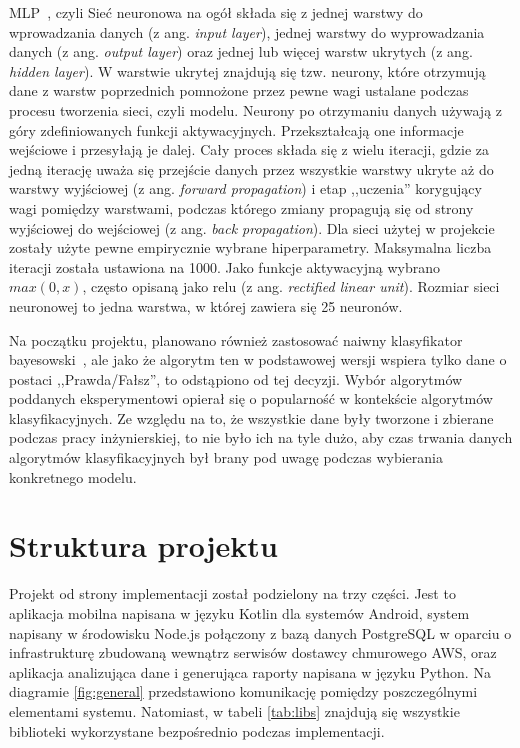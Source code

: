 \documentclass[a4paper,twoside,12pt]{book}
\newcommand{\obcy}[1]{\emph{#1}}
\newcommand{\ang}[1]{{\selectlanguage{british}\obcy{#1}}}
\begin{document}
MLP~\cite{mlp}, czyli Sieć neuronowa na ogół składa się z jednej warstwy do wprowadzania danych (z ang. \ang{input layer}), jednej warstwy do wyprowadzania danych (z ang. \ang{output layer}) oraz jednej lub więcej warstw ukrytych (z ang. \ang{hidden layer}). W warstwie ukrytej znajdują się tzw. neurony, które otrzymują dane z warstw poprzednich pomnożone przez pewne wagi ustalane podczas procesu tworzenia sieci, czyli modelu. Neurony po otrzymaniu danych używają z góry zdefiniowanych funkcji aktywacyjnych. Przekształcają one informacje wejściowe i przesyłają je dalej. Cały proces składa się z wielu iteracji, gdzie za jedną iterację uważa się przejście danych przez wszystkie warstwy ukryte aż do warstwy wyjściowej (z ang. \ang{forward propagation}) i etap ,,uczenia''  korygujący wagi pomiędzy warstwami, podczas którego zmiany propagują się od strony wyjściowej do wejściowej (z ang. \ang{back propagation}). Dla sieci użytej w projekcie zostały użyte pewne empirycznie wybrane hiperparametry. Maksymalna liczba iteracji została ustawiona na 1000. Jako funkcje aktywacyjną wybrano $max(0, x)$, często opisaną jako relu (z ang. \ang{rectified linear unit}).
Rozmiar sieci neuronowej to jedna warstwa, w której zawiera się 25 neuronów.

Na początku projektu, planowano również zastosować naiwny klasyfikator bayesowski~\cite{naive}, ale jako że algorytm ten w podstawowej wersji wspiera tylko dane o postaci ,,Prawda/Fałsz'', to odstąpiono od tej decyzji. Wybór algorytmów poddanych eksperymentowi opierał się o popularność w kontekście algorytmów klasyfikacyjnych. Ze względu na to, że wszystkie dane były tworzone i zbierane podczas pracy inżynierskiej, to nie było ich na tyle dużo, aby czas trwania danych algorytmów klasyfikacyjnych był brany pod uwagę podczas wybierania konkretnego modelu. 

\section{Struktura projektu}
\label{structure}
Projekt od strony implementacji został podzielony na trzy części. Jest to aplikacja mobilna napisana w języku Kotlin dla systemów Android, system napisany w środowisku Node.js połączony z bazą danych PostgreSQL w oparciu o infrastrukturę zbudowaną wewnątrz serwisów dostawcy chmurowego AWS, oraz aplikacja analizująca dane i generująca raporty napisana w języku Python. Na diagramie \ref{fig:general} przedstawiono komunikację pomiędzy poszczególnymi elementami systemu. Natomiast, w tabeli \ref{tab:libs} znajdują się wszystkie biblioteki wykorzystane bezpośrednio podczas implementacji.  
\end{document}
